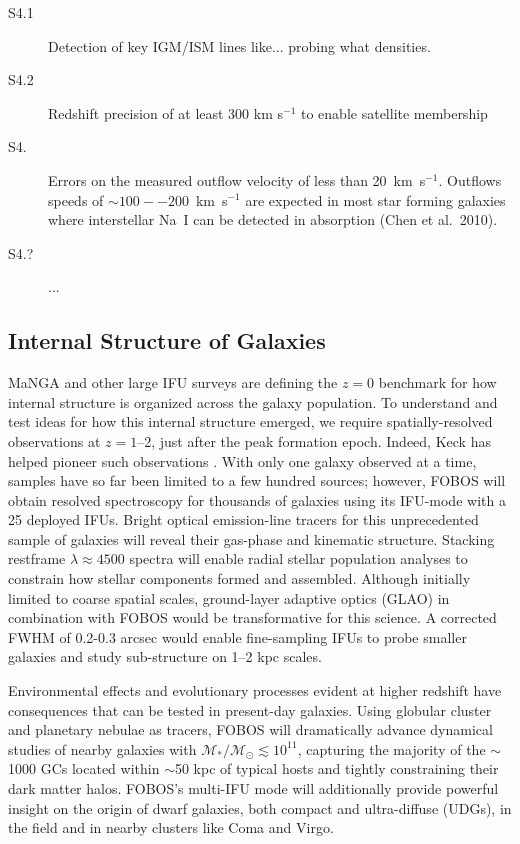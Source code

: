\documentclass[preprint,11pt]{aastex}
\newcommand{\kms}{{\rm km s$^{-1}$}}
\begin{document}
\begin{description}

\item[S4.1] Detection of key IGM/ISM lines like... probing what densities.

\item[S4.2] Redshift precision of at least 300 \kms{} to enable satellite membership


\item[S4.] Errors on the measured outflow velocity of less than
 20~km~s$^{-1}$.  Outflows speeds of $\sim100 -- 200$~km~s$^{-1}$ are
 expected in most star forming galaxies where interstellar Na~I can
 be detected in absorption (Chen et al.~2010).


\item[S4.?] ...


\end{description}


\subsection{Internal Structure of Galaxies}
\label{sci:internal}

MaNGA \citep{bundy15} and other large IFU surveys are defining the
$z=0$ benchmark for how internal structure is organized across the
galaxy population. To understand and test ideas for how this internal
structure emerged, we require spatially-resolved observations at $z =
1$--2, just after the peak formation epoch. Indeed, Keck has
helped pioneer such observations \citep[e.g.,][]{erb04, miller11,law09}.
With only one galaxy observed at a time, samples have so far been limited to a few hundred sources; however,
FOBOS will obtain resolved spectroscopy for thousands of galaxies
using its IFU-mode with a 25 deployed IFUs. Bright optical emission-line tracers
for this unprecedented sample of galaxies will reveal their gas-phase
and kinematic structure. Stacking restframe $\lambda \approx 4500$
spectra will enable radial stellar population analyses to constrain
how stellar components formed and assembled. Although initially
limited to coarse spatial scales, ground-layer adaptive optics (GLAO)
in combination with FOBOS would be transformative for this science. A
corrected FWHM of 0.2-0.3 arcsec would enable fine-sampling IFUs to
probe smaller galaxies and study sub-structure on 1--2 kpc scales.

Environmental effects and evolutionary processes evident at higher redshift have consequences that can be tested in present-day galaxies.  Using globular cluster and planetary nebulae as tracers, FOBOS will
dramatically advance dynamical studies of nearby galaxies with
$\mathcal{M_\ast/M_\odot} \lesssim 10^{11}$, capturing the majority
of the $\sim$1000 GCs located within $\sim$50 kpc of typical hosts
\citep[see][]{2013ApJ...772...82H} and tightly constraining their
dark matter halos. FOBOS's multi-IFU mode will additionally provide
powerful insight on the origin of dwarf galaxies, both compact and
ultra-diffuse (UDGs), in the field and in nearby clusters like Coma
and Virgo.
\end{document}
